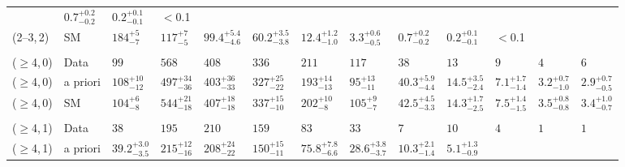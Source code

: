 \begin{table}[!t]
{\begin{tabular}{ lllllllllllll }
             & $0.7^{+0.2}_{-0.2}$
             & $0.2^{+0.1}_{-0.1}$
             & $<$0.1                                   \\
    (2--3,\,2)
             & SM
             & $184^{+5}_{-7}$
             & $117^{+7}_{-5}$
             & $99.4^{+5.4}_{-4.6}$
             & $60.2^{+3.5}_{-3.8}$
             & $12.4^{+1.2}_{-1.0}$
             & $3.3^{+0.6}_{-0.5}$
             & $0.7^{+0.2}_{-0.2}$
             & $0.2^{+0.1}_{-0.1}$
             & $<$0.1                                   \\\\[-2ex]
    ($\geq$4,\,0)
             & Data
             & $99$
             & $568$
             & $408$
             & $336$
             & $211$
             & $117$
             & $38$
             & $13$
             & $9$
             & $4$
             & $6$                                      \\
    ($\geq$4,\,0)
             & a priori
             & $108^{+10}_{-12}$
             & $497^{+34}_{-36}$
             & $403^{+36}_{-33}$
             & $327^{+25}_{-22}$
             & $193^{+14}_{-13}$
             & $95^{+13}_{-11}$
             & $40.3^{+5.9}_{-4.4}$
             & $14.5^{+3.5}_{-2.4}$
             & $7.1^{+1.7}_{-1.4}$
             & $3.2^{+0.7}_{-1.0}$
             & $2.9^{+0.7}_{-0.5}$                      \\
    ($\geq$4,\,0)
             & SM
             & $104^{+6}_{-8}$
             & $544^{+21}_{-18}$
             & $407^{+18}_{-18}$
             & $337^{+15}_{-10}$
             & $202^{+10}_{-8}$
             & $105^{+9}_{-7}$
             & $42.5^{+4.5}_{-3.3}$
             & $14.3^{+1.7}_{-2.5}$
             & $7.5^{+1.4}_{-1.5}$
             & $3.5^{+0.8}_{-0.8}$
             & $3.4^{+1.0}_{-0.7}$                      \\\\[-2ex]
    ($\geq$4,\,1)
             & Data
             & $38$
             & $195$
             & $210$
             & $159$
             & $83$
             & $33$
             & $7$
             & $10$
             & $4$
             & $1$
             & $1$                                      \\
    ($\geq$4,\,1)
             & a priori
             & $39.2^{+3.0}_{-3.5}$
             & $215^{+12}_{-16}$
             & $208^{+24}_{-22}$
             & $150^{+15}_{-11}$
             & $75.8^{+7.8}_{-6.6}$
             & $28.6^{+3.8}_{-3.7}$
             & $10.3^{+2.1}_{-1.4}$
             & $5.1^{+1.3}_{-0.9}$

\end{tabular}}
\end{table}
